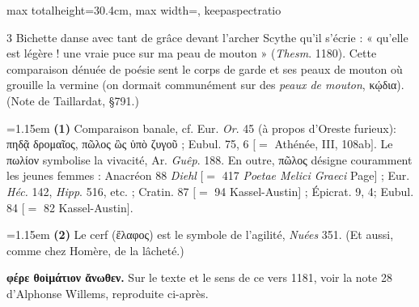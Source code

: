 \documentclass[11pt,twoside]{book}
\newcommand{\italique}[1]{\textit{#1}}
\begin{document}
\begin{adjustbox}{max totalheight=30.4cm, max width=\textwidth, keepaspectratio}
\begin{minipage}{\textwidth}
{\begin{multicols}{3}
\noindent Bichette danse avec tant de grâce devant l'archer Scythe qu'il s'écrie : « qu'elle est légère ! une vraie puce sur ma peau de mouton » (\italique{Thesm}. 1180). Cette comparaison dénuée de poésie sent le corps de garde et ses peaux de mouton où grouille la vermine (on dormait communément sur des \italique{peaux de mouton}, κῴδια). (Note de Taillardat, §791.)
\par\vspace{1.5pt}
\par\vspace{1.2pt}\par\nopagebreak\vspace{1pt}\noindent\hangindent=1.15em {\color{sepiaNote}\textbf{(1)}} Comparaison banale, cf. Eur. \italique{Or}. 45 (à propos d'Oreste furieux): πηδᾷ δρομαῖος, πῶλος ὣς ὑπὸ ζυγοῦ ; Eubul. 75, 6 $[=$ Athénée, III, 108ab$]$. Le πωλίον symbolise la vivacité, Ar. \italique{Guêp}. 188. En outre, πῶλος désigne couramment les jeunes femmes : Anacréon 88 \italique{Diehl} [$=$ 417 \italique{Poetae Melici Graeci} Page$]$ ; Eur. \italique{Héc.} 142, \italique{Hipp}. 516, etc. ; Cratin. 87 $[=$ 94 Kassel-Austin$]$ ; Épicrat. 9, 4; Eubul. 84 $[=$ 82 Kassel-Austin$]$.
\par\vspace{1.5pt}
\noindent\hangindent=1.15em {\color{sepiaNote}\textbf{(2)}} Le cerf (ἔλαφος) est le symbole de l'agilité, \italique{Nuées} 351. (Et aussi, comme chez Homère, de la lâcheté.)
\par\vspace{1.5pt}
 \textbf{φέρε θοἰμάτιον ἄνωθεν.} Sur le texte et le sens de ce vers 1181, voir la note 28 d'Alphonse Willems, reproduite ci-après.
\par\end{multicols}}
\end{minipage}\end{adjustbox}
\newpage
\end{document}

